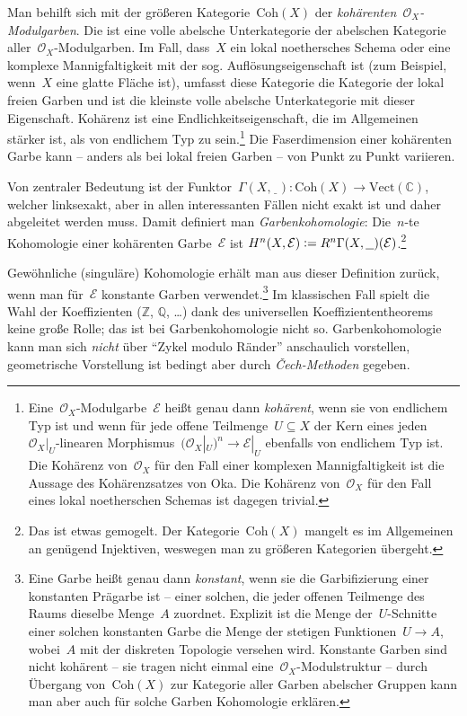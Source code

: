 \documentclass[a4paper,ngerman,12pt]{scrartcl}
\theoremstyle{definition}
\theoremstyle{plain}
\theoremstyle{remark}
\newcommand{\CC}{\mathbb{C}}
\newcommand{\ZZ}{\mathbb{Z}}
\newcommand{\QQ}{\mathbb{Q}}
\newcommand{\E}{\mathcal{E}}
\renewcommand{\O}{\mathcal{O}}
\newcommand{\Vect}{\mathrm{Vect}}
\newcommand{\Coh}{\mathrm{Coh}}
\newcommand{\placeholder}{\underline{\ \ }}
\newcommand{\defeq}{\vcentcolon=}
\begin{document}
Man behilft sich mit der größeren Kategorie~$\Coh(X)$ der
\emph{kohärenten~$\O_X$-Modulgarben}. Die ist eine volle abelsche Unterkategorie der
abelschen Kategorie aller~$\O_X$-Modulgarben. Im Fall, dass~$X$ ein
lokal noethersches Schema oder eine komplexe Mannigfaltigkeit mit der sog.
Auflösungseigenschaft ist (zum Beispiel, wenn~$X$ eine glatte Fläche ist), umfasst
diese Kategorie die Kategorie der lokal freien Garben und ist die kleinste
volle abelsche Unterkategorie mit dieser Eigenschaft. Kohärenz ist eine
Endlichkeitseigenschaft, die im Allgemeinen stärker ist, als von endlichem Typ
zu sein.\footnote{Eine~$\O_X$-Modulgarbe~$\E$ heißt genau dann \emph{kohärent},
wenn sie von endlichem Typ ist und wenn für jede offene Teilmenge~$U \subseteq
X$ der Kern eines jeden~$\O_X|_U$-linearen Morphismus~$(\O_X|_U)^n \to \E|_U$
ebenfalls von endlichem Typ ist. Die Kohärenz von~$\O_X$ für den Fall einer
komplexen Mannigfaltigkeit ist die Aussage des Kohärenzsatzes von Oka. Die
Kohärenz von~$\O_X$ für den Fall eines lokal noetherschen Schemas ist dagegen
trivial.} Die Faserdimension einer kohärenten Garbe kann -- anders als bei lokal freien
Garben -- von Punkt zu Punkt variieren.

Von zentraler Bedeutung ist der Funktor~$\Gamma(X,\placeholder) : \Coh(X) \to
\Vect(\CC)$, welcher linksexakt, aber in allen interessanten Fällen nicht
exakt ist und daher abgeleitet werden muss. Damit definiert man
\emph{Garbenkohomologie}: Die~$n$-te Kohomologie einer kohärenten Garbe~$\E$
ist $H^n(X, \E) \defeq R^n \Gamma(X,\placeholder)(\E)$.\footnote{Das ist etwas
gemogelt. Der Kategorie~$\Coh(X)$ mangelt es im Allgemeinen an genügend
Injektiven, weswegen man zu größeren Kategorien übergeht.}

Gewöhnliche (singuläre) Kohomologie erhält man aus dieser Definition zurück,
wenn man für~$\E$ konstante Garben verwendet.\footnote{Eine Garbe heißt genau
dann \emph{konstant}, wenn sie die Garbifizierung einer konstanten Prägarbe ist
-- einer solchen, die jeder offenen Teilmenge des Raums dieselbe Menge~$A$
zuordnet. Explizit ist die Menge der~$U$-Schnitte einer solchen konstanten Garbe
die Menge der stetigen Funktionen~$U \to A$, wobei~$A$ mit der diskreten
Topologie versehen wird. Konstante Garben sind nicht kohärent -- sie tragen
nicht einmal eine~$\O_X$-Modulstruktur -- durch Übergang von~$\Coh(X)$ zur
Kategorie aller Garben abelscher Gruppen kann man aber auch für solche Garben
Kohomologie erklären.} Im klassischen Fall spielt die Wahl der Koeffizienten
($\ZZ$, $\QQ$, \ldots) dank des universellen Koeffiziententheorems keine große
Rolle; das ist bei Garbenkohomologie nicht so. Garbenkohomologie kann man sich
\emph{nicht} über "`Zykel modulo Ränder"' anschaulich vorstellen, geometrische
Vorstellung ist bedingt aber durch \emph{Čech-Methoden} gegeben.
\end{document}
